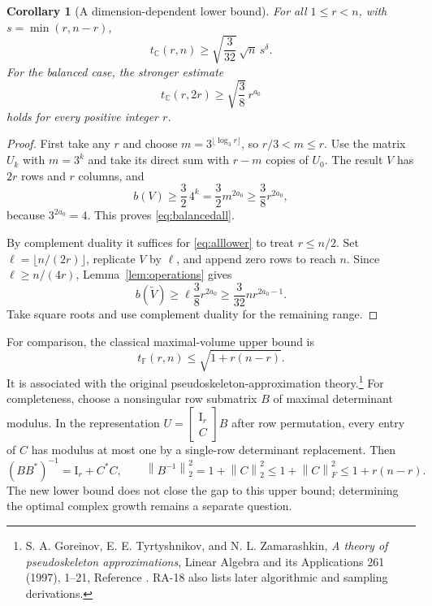 \documentclass[11pt,letterpaper]{article}
\newtheorem{corollary}[theorem]{Corollary}
\theoremstyle{definition}
\theoremstyle{remark}
\newcommand{\C}{\mathbb C}
\newcommand{\F}{\mathbb F}
\newcommand{\Id}{\mathrm I}
\newcommand{\norm}[1]{\left\lVert#1\right\rVert}
\begin{document}
\begin{corollary}[A dimension-dependent lower bound]\label{cor:alldim}
For all $1\le r<n$, with $s=\min(r,n-r)$,
\begin{equation}
 t_\C(r,n)\ge\sqrt{\frac3{32}}\,\sqrt n\,s^{\delta}.
 \label{eq:alllower}
\end{equation}
For the balanced case, the stronger estimate
\begin{equation}
 t_\C(r,2r)\ge\sqrt{\frac38}\,r^{a_0}
 \label{eq:balancedall}
\end{equation}
holds for every positive integer $r$.
\end{corollary}
\begin{proof}
First take any $r$ and choose $m=3^{\lfloor\log_3r\rfloor}$, so $r/3<m\le r$. Use the matrix $U_k$ with $m=3^k$ and take its direct sum with $r-m$ copies of $U_0$. The result $V$ has $2r$ rows and $r$ columns, and
\[
 b(V)\ge\frac32\,4^k=\frac32m^{2a_0}
 \ge\frac38r^{2a_0},
\]
because $3^{2a_0}=4$. This proves \eqref{eq:balancedall}.

By complement duality it suffices for \eqref{eq:alllower} to treat $r\le n/2$. Set $\ell=\lfloor n/(2r)\rfloor$, replicate $V$ by $\ell$, and append zero rows to reach $n$. Since $\ell\ge n/(4r)$, Lemma~\ref{lem:operations} gives
\[
 b(\widetilde V)\ge\ell\frac38r^{2a_0}
 \ge\frac3{32}n r^{2a_0-1}.
\]
Take square roots and use complement duality for the remaining range.
\end{proof}

For comparison, the classical maximal-volume upper bound is
\begin{equation}
 t_\F(r,n)\le\sqrt{1+r(n-r)}.\label{eq:classical}
\end{equation}
It is associated with the original pseudoskeleton-approximation theory.\footnote{S. A. Goreinov, E. E. Tyrtyshnikov, and N. L. Zamarashkin, \emph{A theory of pseudoskeleton approximations}, Linear Algebra and its Applications 261 (1997), 1--21, Reference \cite{gtz}. RA-18 also lists later algorithmic and sampling derivations.}
For completeness, choose a nonsingular row submatrix $B$ of maximal determinant modulus. In the representation $U=\begin{bmatrix}\Id_r\\C\end{bmatrix}B$ after row permutation, every entry of $C$ has modulus at most one by a single-row determinant replacement. Then
\[
 (BB^*)^{-1}=\Id_r+C^*C,
 \qquad \norm{B^{-1}}_2^2=1+\norm C_2^2
 \le1+\norm C_F^2\le1+r(n-r).
\]
The new lower bound does not close the gap to this upper bound; determining the optimal complex growth remains a separate question.
\end{document}
